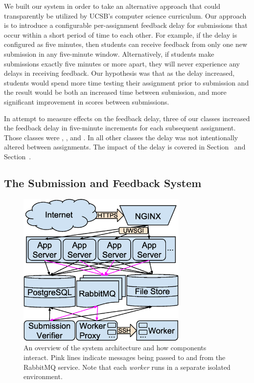 We built our system in order to take an alternative approach that could
transparently be utilized by UCSB's computer science curriculum. Our approach
is to introduce a configurable per-assignment feedback delay for submissions
that occur within a short period of time to each other. For example, if the
delay is configured as five minutes, then students can receive feedback from
only one new submission in any five-minute window. Alternatively, if students
make submissions exactly five minutes or more apart, they will never experience
any delays in receiving feedback. Our hypothesis was that as the delay
increased, students would spend more time testing their assignment prior to
submission and the result would be both an increased time between submission,
and more significant improvement in scores between submissions.

In attempt to measure effects on the feedback delay, three of our classes
increased the feedback delay in five-minute increments for each subsequent
assignment. Those classes were , , and . In
all other classes the delay was not intentionally altered between
assignments. The impact of the delay is covered in
Section~ and Section~.


\subsection{The Submission and Feedback System}

\begin{figure}[!t]
\centering \includegraphics[width=3.3in]{graphs/architecture.eps}
\caption{An overview of the system architecture and how components
  interact. Pink lines indicate messages being passed to and from the RabbitMQ
  service. Note that each \emph{worker} runs in a separate isolated
  environment.}
\end{figure}

